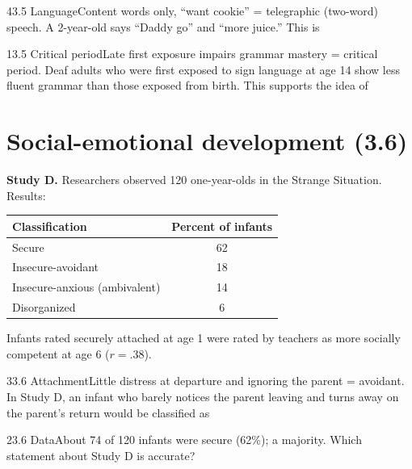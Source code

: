 \documentclass[11pt]{article}
\begin{document}
\begin{q}{4}{3.5 Language}{Content words only, ``want cookie'' = telegraphic (two-word) speech.}
A 2-year-old says ``Daddy go'' and ``more juice.'' This is
\end{q}

\begin{q}{1}{3.5 Critical period}{Late first exposure impairs grammar mastery = critical period.}
Deaf adults who were first exposed to sign language at age 14 show less fluent grammar than those exposed from birth. This supports the idea of
\end{q}

\section{Social-emotional development (3.6)}

\begin{stimulus}
\textbf{Study D.} Researchers observed 120 one-year-olds in the Strange Situation. Results:
\begin{center}
\begin{tabular}{lc}
\toprule
Classification & Percent of infants\\\midrule
Secure & 62\\
Insecure-avoidant & 18\\
Insecure-anxious (ambivalent) & 14\\
Disorganized & 6\\
\bottomrule
\end{tabular}
\end{center}
Infants rated securely attached at age 1 were rated by teachers as more socially competent at age 6 (\(r = .38\)).
\end{stimulus}

\begin{q}{3}{3.6 Attachment}{Little distress at departure and ignoring the parent = avoidant.}
In Study D, an infant who barely notices the parent leaving and turns away on the parent's return would be classified as
\end{q}

\begin{q}{2}{3.6 Data}{About 74 of 120 infants were secure (62\%); a majority.}
Which statement about Study D is accurate?
\end{q}
\end{document}
